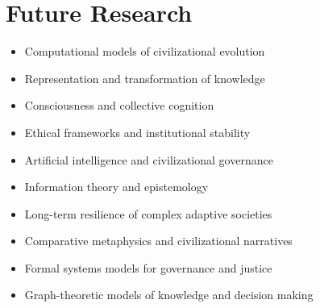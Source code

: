 \section*{Future Research}
\begin{itemize}
	\item Computational models of civilizational evolution
	\item Representation and transformation of knowledge
	\item Consciousness and collective cognition
	\item Ethical frameworks and institutional stability
	\item Artificial intelligence and civilizational governance
	\item Information theory and epistemology
	\item Long-term resilience of complex adaptive societies
	\item Comparative metaphysics and civilizational narratives
	\item Formal systems models for governance and justice
	\item Graph-theoretic models of knowledge and decision making
\end{itemize}